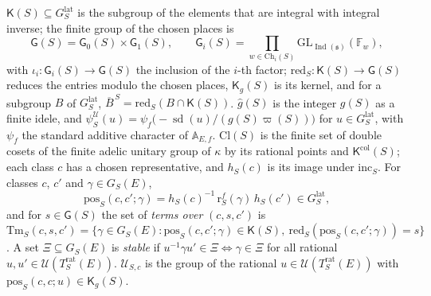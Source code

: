 \documentclass[11pt,a4paper]{article}
\newcommand{\F}{\mathbb{F}}
\newcommand{\m}[1]{\mbox{$#1$}}        %
\theoremstyle{plainx}
\theoremstyle{uprightx}
\newcommand{\fs}{\mathfrak{s}}                      %
\newcommand{\AEf}{\mathbb{A}_{E,f}}
\newcommand{\GL}{\mathrm{GL}}
\newcommand{\Ix}[1]{\operatorname{Ind}(#1)}                          %
\newcommand{\gS}[1]{g(#1)}                          %
\newcommand{\vpS}[1]{\varpi(#1)}                    %
\newcommand{\ChS}[2]{\mathrm{Ch}_{#2}(#1)}          %
\newcommand{\KcolS}[1]{\mathsf{K}^{\mathrm{col}}(#1)}        %
\newcommand{\Trat}[2]{T^{\mathrm{rat}}_{#1}(#2)}    %
\newcommand{\GS}[2]{G_{#1}(#2)}                     %
\newcommand{\GFin}[1]{G^{\mathrm{lat}}_{#1}}        %
\newcommand{\GRes}[1]{\mathsf{G}(#1)}               %
\newcommand{\Cl}[1]{\mathrm{Cl}(#1)}                %
\newcommand{\KS}[1]{\mathsf{K}(#1)}                          %
\newcommand{\redS}[1]{\mathrm{red}_{#1}}            %
\newcommand{\KgS}[1]{\mathsf{K}_g(#1)}                       %
\newcommand{\redim}[2]{\overline{#2}^{\,#1}}        %
\newcommand{\gid}[1]{\hat{g}(#1)}                   %
\newcommand{\rfin}[1]{\mathrm{r}^{f}_{#1}}          %
\newcommand{\incH}[1]{\mathrm{inc}_{#1}}            %
\newcommand{\hc}[2]{h_{#1}(#2)}                     %
\newcommand{\pos}[4]{\mathrm{pos}_{#1}(#2,#3;#4)}   %
\newcommand{\terms}[4]{\mathrm{Tm}_{#1}(#2,#3,#4)}  %
\newcommand{\clU}[2]{\mathcal{U}_{#1,#2}}           %
\newcommand{\uchar}[2]{\psi^{\mathcal{U}}_{#1}(#2)} %
\begin{document}
\m{\KS{S}\subseteq\GFin{S}} is the subgroup of the elements that are integral with integral inverse; the finite
group of the chosen places is
\[\GRes{S}=\mathsf{G}_0(S)\times\mathsf{G}_1(S),\qquad\mathsf{G}_i(S)=\prod_{w\in\ChS{S}{i}}\GL_{\Ix{\fs}}(\F_w),\]
with \m{\iota_i\colon\mathsf{G}_i(S)\to\GRes{S}} the inclusion of the $i$-th factor; \m{\redS{S}\colon\KS{S}\to\GRes{S}}
reduces the entries modulo the chosen places, \m{\KgS{S}} is its kernel, and for a subgroup $B$ of \m{\GFin{S}},
\m{\redim{S}{B}=\redS{S}(B\cap\KS{S})}. \m{\gid{S}} is the integer \m{\gS{S}} as a finite idele, and
$\uchar{S}{u}=\psi_f\bigl(-\operatorname{sd}(u)/(\gS{S}\vpS{S})\bigr)$ for \m{u\in\GFin{S}}, with $\psi_f$ the
standard additive character of \m{\AEf}. \m{\Cl{S}} is the finite set of double cosets of the finite adelic
unitary group of $\kappa$ by its rational points and \m{\KcolS{S}}; each class $c$ has a chosen representative,
and \m{\hc{S}{c}} is its image under \m{\incH{S}}. For classes $c$, $c'$ and \m{\gamma\in\GS{S}{E}},
\[\pos{S}{c}{c'}{\gamma}=\hc{S}{c}^{-1}\,\rfin{S}(\gamma)\,\hc{S}{c'}\in\GFin{S},\]
and for \m{s\in\GRes{S}} the set of \emph{terms over} \m{(c,s,c')} is
$\terms{S}{c}{s}{c'}=\{\gamma\in\GS{S}{E}:\pos{S}{c}{c'}{\gamma}\in\KS{S},\ \redS{S}(\pos{S}{c}{c'}{\gamma})=s\}$.
A set \m{\Xi\subseteq\GS{S}{E}} is \emph{stable} if \m{u^{-1}\gamma u'\in\Xi\iff\gamma\in\Xi} for all rational
\m{u,u'\in\mathcal U(\Trat{S}{E})}. \m{\clU{S}{c}} is the group of the rational \m{u\in\mathcal U(\Trat{S}{E})}
with \m{\pos{S}{c}{c}{u}\in\KgS{S}}.
\end{document}
